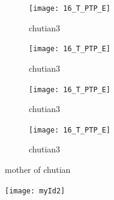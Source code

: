 \documentclass[%
reprint,
amsmath,amssymb,
aps,
]{revtex4-2}
\begin{document}
	\begin{figure}[htbp]
	\centering
	\begin{subfigure}{0.49\linewidth}
		\centering
			\texttt{[image: 16\_T\_PTP\_E]}
		\caption{chutian3}
		\label{chutian3}%
	\end{subfigure}
	\centering
	\begin{subfigure}{0.49\linewidth}
		\centering
		\texttt{[image: 16\_T\_PTP\_E]}
		\caption{chutian3}
		\label{chutian3}%
	\end{subfigure}
	\centering
	\begin{subfigure}{0.49\linewidth}
		\centering
		\texttt{[image: 16\_T\_PTP\_E]}
		\caption{chutian3}
		\label{chutian3}%
	\end{subfigure}
	\begin{subfigure}{0.49\linewidth}
		\centering
		\texttt{[image: 16\_T\_PTP\_E]}
		\caption{chutian3}		
		\label{chutian3}%
	\end{subfigure}

	\caption{mother of chutian}
	\label{da_chutian}
	\end{figure}
	\begin{figure}
		\centering
		\texttt{[image: myId2]}
		\caption{}
		\label{fig:myid1}
	\end{figure}
	
\end{document}
